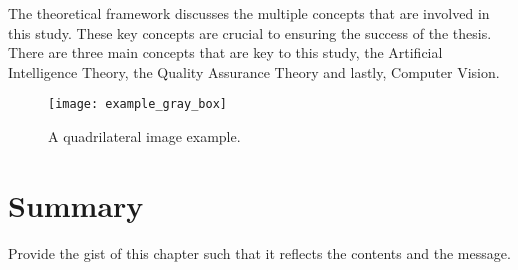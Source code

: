 The theoretical framework discusses the multiple concepts that are involved in this study. These key concepts are crucial to ensuring the success of the thesis. There are three main concepts that are key to this study, the Artificial Intelligence Theory, the Quality Assurance Theory and lastly, Computer Vision.


\begin{figure}[!htbp]
	\centering
		\texttt{[image: example\_gray\_box]}
	\caption{A quadrilateral image example.}
	\label{fig:exampletc}
\end{figure}

\section{Summary}

Provide the gist of this chapter such that it reflects the contents and the message.